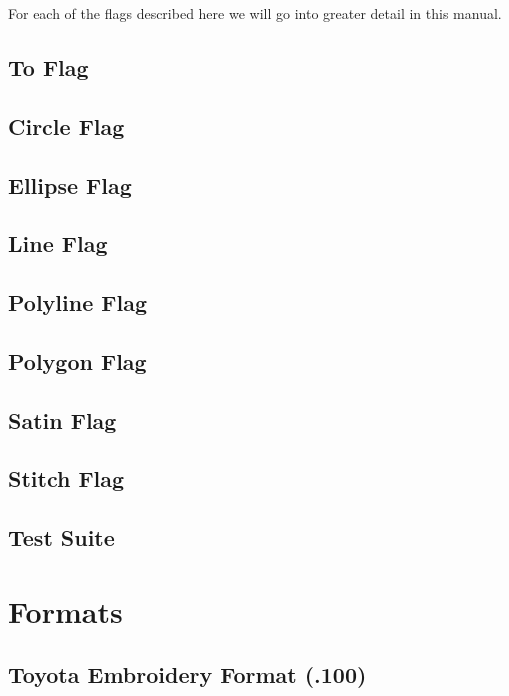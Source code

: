 \documentclass[onesize, a4paper]{refart}
\begin{document}
For each of the flags described here we will go into greater detail in
this manual.

\subsection{To Flag}

\subsection{Circle Flag}

\subsection{Ellipse Flag}

\subsection{Line Flag}

\subsection{Polyline Flag}

\subsection{Polygon Flag}

\subsection{Satin Flag}

\subsection{Stitch Flag}

\subsection{Test Suite}

\section{Formats}

\subsection{Toyota Embroidery Format (.100)}
\end{document}
